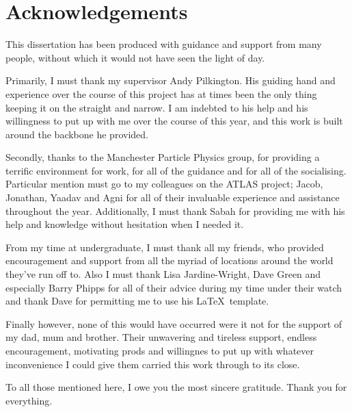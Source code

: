 \chapter*{Acknowledgements}


This dissertation has been produced with guidance and support from many people, without which it would not have seen the light of day.

Primarily, I must thank my supervisor Andy Pilkington. His guiding hand and experience over the course of this project has at times been the only thing keeping it on the straight and narrow. I am indebted to his help and his willingness to put up with me over the course of this year, and this work is built around the backbone he provided.

Secondly, thanks to the Manchester Particle Physics group, for providing a terrific environment for work, for all of the guidance and for all of the socialising. Particular mention must go to my colleagues on the ATLAS project; Jacob, Jonathan, Yaadav and Agni for all of their invaluable experience and assistance throughout the year. Additionally, I must thank Sabah for providing me with his help and knowledge without hesitation when I needed it.

From my time at undergraduate, I must thank all my friends, who provided encouragement and support from all the myriad of locations around the world they've run off to. Also I must thank Lisa Jardine-Wright, Dave Green and especially Barry Phipps for all of their advice during my time under their watch and thank Dave for permitting me to use his \LaTeX\ template.

Finally however, none of this would have occurred were it not for the support of my dad, mum and brother. Their unwavering and tireless support, endless encouragement, motivating prods and willingnes to put up with whatever inconvenience I could give them carried this work through to its close.

To all those mentioned here, I owe you the most sincere gratitude. Thank you for everything.
\cleardoublepage

\endinput
